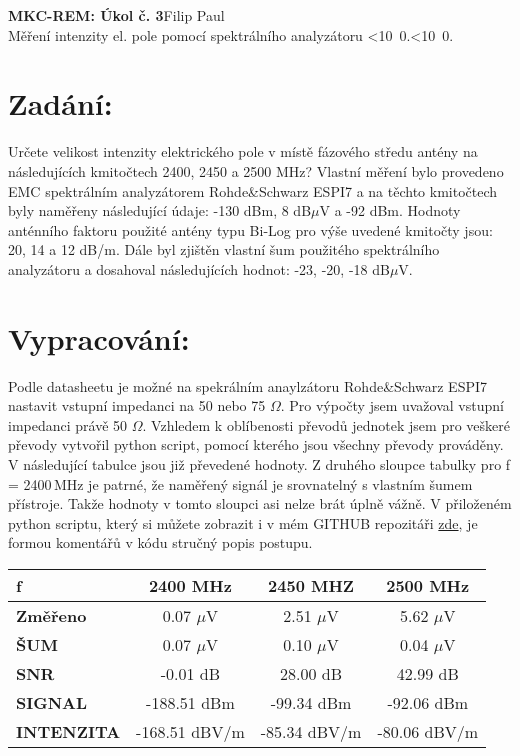 \documentclass[10pt, a4paper]{article}%
\def\mydate{\leavevmode\hbox{\twodigits\day.\twodigits\month.\the\year}}
\def\twodigits#1{\ifnum#1<10 0\fi\the#1}
\begin{document}
\begin{flushleft}%
	\textbf{\Large{MKC-REM: Úkol č. 3}}\hfill Filip Paul\\
	\large{Měření intenzity el. pole pomocí spektrálního analyzátoru \hfill\mydate}
\end{flushleft}
	\section*{\Large Zadání:}
	Určete velikost intenzity elektrického pole v místě fázového středu antény na následujících
	kmitočtech 2400, 2450 a 2500 MHz? Vlastní měření bylo provedeno EMC spektrálním
	analyzátorem Rohde\&Schwarz ESPI7 a na těchto kmitočtech byly naměřeny následující údaje:
	-130 dBm, 8 dB$\mu$V a -92 dBm. Hodnoty anténního faktoru použité antény typu Bi-Log pro výše
	uvedené kmitočty jsou: 20, 14 a 12 dB/m. Dále byl zjištěn vlastní šum použitého spektrálního
	analyzátoru a dosahoval následujících hodnot: -23, -20, -18 dB$\mu$V.


	\section*{\Large Vypracování:}
	Podle datasheetu je možné na spekrálním anaylzátoru Rohde\&Schwarz ESPI7 nastavit vstupní impedanci na 50 nebo 75 $\Omega$.
	Pro výpočty jsem uvažoval vstupní impedanci právě 50 $\Omega$. Vzhledem k oblíbenosti převodů jednotek jsem 
	pro veškeré převody vytvořil python script, pomocí kterého jsou všechny převody prováděny. V následující tabulce
	jsou již převedené hodnoty. Z druhého sloupce tabulky pro f = 2400\,MHz je patrné, že naměřený signál
	je srovnatelný s vlastním šumem přístroje. Takže hodnoty v tomto sloupci asi nelze brát úplně vážně.
	V přiloženém python scriptu, který si můžete zobrazit i v mém GITHUB repozitáři
	\href{https://github.com/FilipPaul/ctvrtak_letni_semestr/blob/main/MKC_REM/ukol_1_prevod_jednotek/README.md}{\color{blue} zde}, je
	formou komentářů v kódu stručný popis postupu.

	 \begin{table}[htbp]
		\centering
		  \begin{tabular}{|l|c|c|c|}
		  \hline
		  \textbf{f} & \textbf{2400 MHz} & \textbf{2450 MHZ} & \textbf{2500 MHz} \bigstrut\\
		  \hline
		  \textbf{Změřeno} & 0.07 $\mu$V &  2.51 $\mu$V &  5.62 $\mu$V \bigstrut\\
		  \hline
		  \textbf{ŠUM} & 0.07 $\mu$V &  0.10 $\mu$V &  0.04 $\mu$V \bigstrut\\
		  \hline
		  \textbf{SNR} & -0.01 dB &  28.00 dB &  42.99 dB \bigstrut\\
		  \hline
		  \textbf{SIGNAL} & -188.51 dBm &  -99.34 dBm &  -92.06 dBm \bigstrut\\
		  \hline
		  \textbf{INTENZITA} & -168.51 dBV/m &  -85.34 dBV/m &  -80.06 dBV/m \bigstrut\\
		  \hline
		  \end{tabular}%
		\label{tab:addlabel}%
	  \end{table}%
	 
\end{document}
